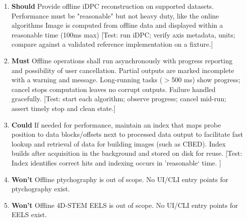 \documentclass[10pt]{article}
\newcommand{\PriorityTag}[2]{%
  \colorbox{#2!25}{\footnotesize\textsf{\textbf{#1}}}\hspace{0.6em}}
\newcommand{\must}{\leavevmode\PriorityTag{Must}{green}}
\newcommand{\should}{\leavevmode\PriorityTag{Should}{yellow}}
\newcommand{\could}{\leavevmode\PriorityTag{Could}{cyan}}
\newcommand{\wont}{\leavevmode\PriorityTag{Won't}{red}}
\newcounter{reqgrp}[section] %
\newcounter{reqno}
\newcommand{\reqprefix}{GEN}
\newenvironment{requirements}[1]{%
  \renewcommand{\reqprefix}{#1}%
  \refstepcounter{reqgrp}%
  \setcounter{reqno}{0}%
  \begin{enumerate}[leftmargin=*]
}{\end{enumerate}}
\begin{document}
\begin{requirements}{OFR}
\item \should {}
  {Provide offline iDPC reconstruction on supported datasets. Performance must be "reasonable" but not heavy duty, like the online algorithms}
  {Image is computed from offline data and displayed within a reasonable time (100ms max)}  %
  [Test: run iDPC; verify axis metadata, units; compare against a validated reference implementation on a fixture.]

\item \must {}
  {Offline operations shall run asynchronously with progress reporting and possibility of user cancellation. Partial outputs are marked incomplete with a warning and message.}
  {Long-running tasks ($>$500 ms) show progress; cancel stops computation leaves no corrupt outputs. Failure handled gracefully.}
  [Test: start each algorithm; observe progress; cancel mid-run; assert timely stop and clean state.]

\item \could {}
  {If needed for performance, maintain an index that maps probe position to data blocks/offsets next to processed data output to facilitate fast lookup and retrieval of data for building images (such as CBED).}
  {Index builds after acquisition in the background and stored on disk for reuse. }
  [Test: Index identifies correct hits and indexing occurs in 'reasonable` time. ]

\item \wont {}
  {Offline ptychography is out of scope.}
  {No UI/CLI entry points for ptychography exist.}


\item \wont {}
  {Offline 4D-STEM EELS is out of scope.}
  {No UI/CLI entry points for EELS exist.}

\end{requirements}
\end{document}
